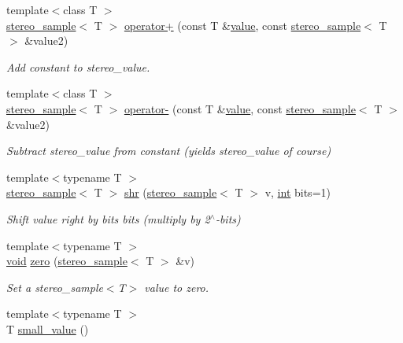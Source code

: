 \begin{DoxyCompactItemize}
{\footnotesize template$<$class T $>$ }\\\hyperlink{structdsp_1_1stereo__sample}{stereo\+\_\+sample}$<$ T $>$ \hyperlink{namespacedsp_ae9378b13094e228c4c32af5bed73ddf6}{operator+} (const T \&\hyperlink{tk_8h_a177a0765f574ef6642002696d9cd82d0}{value}, const \hyperlink{structdsp_1_1stereo__sample}{stereo\+\_\+sample}$<$ T $>$ \&value2)
\begin{DoxyCompactList}\small\item\em Add constant to stereo\+\_\+value. \end{DoxyCompactList}\item 
{\footnotesize template$<$class T $>$ }\\\hyperlink{structdsp_1_1stereo__sample}{stereo\+\_\+sample}$<$ T $>$ \hyperlink{namespacedsp_a428ba1571939cf448f27d42b66fe6fe4}{operator-\/} (const T \&\hyperlink{tk_8h_a177a0765f574ef6642002696d9cd82d0}{value}, const \hyperlink{structdsp_1_1stereo__sample}{stereo\+\_\+sample}$<$ T $>$ \&value2)
\begin{DoxyCompactList}\small\item\em Subtract stereo\+\_\+value from constant (yields stereo\+\_\+value of course) \end{DoxyCompactList}\item 
{\footnotesize template$<$typename T $>$ }\\\hyperlink{structdsp_1_1stereo__sample}{stereo\+\_\+sample}$<$ T $>$ \hyperlink{namespacedsp_a431298d10143001b91af3b231dfc7419}{shr} (\hyperlink{structdsp_1_1stereo__sample}{stereo\+\_\+sample}$<$ T $>$ v, \hyperlink{tk_8h_a83f82f76e7fed06f4c49d2db94028a6d}{int} bits=1)
\begin{DoxyCompactList}\small\item\em Shift value right by \textquotesingle{}bits\textquotesingle{} bits (multiply by 2$^\wedge$-\/bits) \end{DoxyCompactList}\item 
{\footnotesize template$<$typename T $>$ }\\\hyperlink{tk_8h_aba408b7cd755a96426e004c015f5de8e}{void} \hyperlink{namespacedsp_ae9696253f1153142a082f212d1d0083f}{zero} (\hyperlink{structdsp_1_1stereo__sample}{stereo\+\_\+sample}$<$ T $>$ \&v)
\begin{DoxyCompactList}\small\item\em Set a stereo\+\_\+sample$<$\+T$>$ value to zero. \end{DoxyCompactList}\item 
{\footnotesize template$<$typename T $>$ }\\T \hyperlink{namespacedsp_a870586ac5ee3dd8c04e793905875a536}{small\+\_\+value} ()

\end{DoxyCompactItemize}
